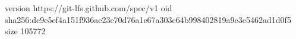 version https://git-lfs.github.com/spec/v1
oid sha256:dc9e5ef4a151f936ae23e70d76a1e67a303e64b998402819a9e3e5462ad1d0f5
size 105772
